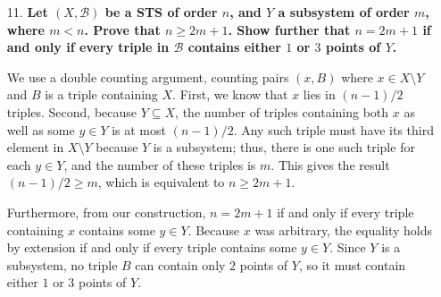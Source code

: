 \documentclass[a4paper,12pt]{article}
\begin{document}
\begin{enumerate}
    \item[11.]
        \boldmath
        \textbf{Let $(X, \mathcal{B})$ be a STS of order $n$, and $Y$ a subsystem of order $m$, where $m < n$. Prove that $n \geq 2m + 1$. Show further that $n = 2m + 1$ if and only if every triple in $\mathcal{B}$ contains either $1$ or $3$ points of $Y$.} \par
        \unboldmath
        We use a double counting argument, counting pairs $(x, B)$ where $x \in X \setminus Y$ and $B$ is a triple containing $X$. First, we know that $x$ lies in $(n - 1)/2$ triples. Second, because $Y \subseteq X$, the number of triples containing both $x$ as well as some $y \in Y$ is at most $(n - 1)/2$. Any such triple must have its third element in $X \setminus Y$ because $Y$ is a subsystem; thus, there is one such triple for each $y \in Y$, and the number of these triples is $m$. This gives the result $(n - 1)/2 \geq m$, which is equivalent to $n \geq 2m + 1$. \par
        Furthermore, from our construction, $n = 2m + 1$ if and only if every triple containing $x$ contains some $y \in Y$. Because $x$ was arbitrary, the equality holds by extension if and only if every triple contains some $y \in Y$. Since $Y$ is a subsystem, no triple $B$ can contain only $2$ points of $Y$, so it must contain either $1$ or $3$ points of $Y$.
\end{enumerate}
\end{document}
